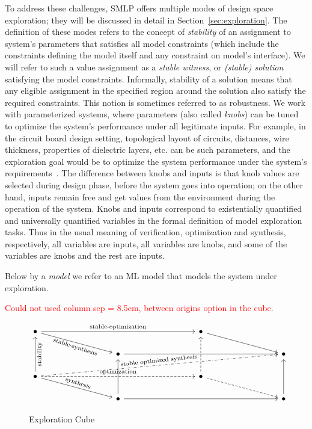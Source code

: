 \documentclass[a4paper,parskip=half]{article} %
\newcommand\todozk[1]{\textcolor{red}{#1}}
\newcommand*\ZK{\todozk}
\begin{document}
To address these challenges, SMLP offers multiple modes of design space exploration; they will be discussed in detail in Section~\ref{sec:exploration}.
The definition of these modes refers to the concept of \emph{stability} of an assignment to system's parameters that satisfies all model constraints 
(which include the constraints defining the model itself and any constraint on model's interface).
We will refer to such a value assignment as a \emph{stable witness}, or \emph{(stable) solution} satisfying the model constraints. 
Informally, stability of a solution means that any eligible assignment in the specified region around the solution also satisfy the required constraints.
This notion is sometimes referred to as robustness. We work with parameterized systems, where parameters (also called \emph{knobs}) can 
be tuned to optimize the system's performance under all legitimate inputs.
For example, in the circuit board design setting, topological layout of circuits, distances, wire thickness, properties of dielectric layers, etc.
can be such parameters, and the exploration goal would be to optimize the system performance under the system's requirements~\cite{9501615}.
The difference between knobs and inputs is that knob values are selected during design phase, before the system goes into operation; on the other hand, 
inputs remain free and get values from the environment during the operation of the system. Knobs and inputs correspond to existentially quantified 
and universally quantified variables in the formal definition of model exploration tasks. Thus in the usual meaning of verification, optimization and synthesis, 
respectively, all variables are inputs, all variables are knobs, and some of the variables are knobs and the rest are inputs.


Below by a \emph{model} we refer to an ML model that models the system under exploration.

\ZK{Could not used column sep = {8.5em, between origins} option in the cube.}
\begin{figure}[bp] %
\centering
\[
    \begin{tikzcd}[row sep=1.5em, column sep = {8.5em}, my label/.style={midway, sloped}]
    \bullet
    \arrow[rr, "\text{stable-optimization}"]
    \arrow[dr, swap,"\text{stable-synthesis}"{anchor=north,rotate=-18}]
    &&
    \bullet
    \arrow[dr]
    \\
    &
    \bullet
    \arrow[rr]
    &&
    \bullet
    \\
    \bullet
    \arrow[uu, "\text{stability}"{anchor=north,rotate=90}] 
    \arrow[rr, dashed, "\text{optimization}"] 
    \arrow[dr, swap, "\text{synthesis}"{anchor=south, rotate=-18}] 
    \arrow[rrru, dashdotted, "\text{stable optimized synthesis}"{anchor=south, rotate=6}]
    &&
    \bullet  
    \arrow[dr, dashed] 
    \arrow[uu, dashed]
    \\
    &
    \bullet
    \arrow[rr] 
    \arrow[uu]
    && 
    \bullet
    \arrow[uu]
    \end{tikzcd}
\]
\caption{Exploration Cube}
\label{fig:cube}
\end{figure}
\end{document}
